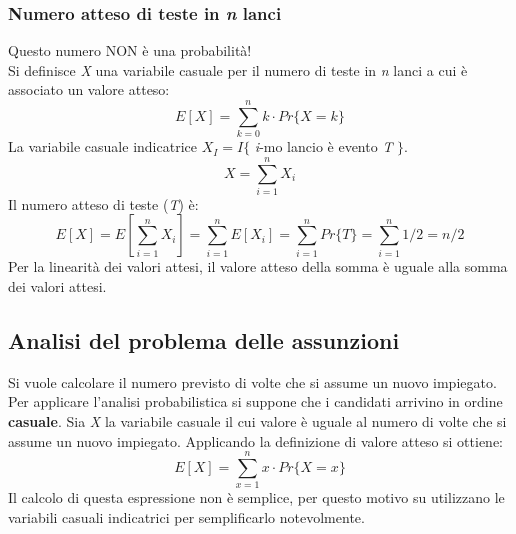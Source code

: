\documentclass[10pt, a4paper]{report}
\begin{document}
\subsubsection{Numero atteso di teste in \textit{n} lanci}
Questo numero NON è una probabilità!\\Si definisce \textit{X} una variabile casuale per il numero di teste in \textit{n} lanci a cui è associato un valore atteso:
\begin{equation*}
E[X] = \sum_{k=0}^{n} k\cdot Pr\{X = k\}
\end{equation*}
La variabile casuale indicatrice $X_I = I\{$ \textit{i}-mo lancio è evento \textit{T} $\}$.
\begin{equation*}
X = \sum_{i=1}^{n}X_i
\end{equation*}
Il numero atteso di teste (\textit{T}) è:
\begin{equation*}
E[X] = E[\sum_{i=1}^{n}X_i] = \sum_{i=1}^{n}E[X_i] = \sum_{i=1}^{n}Pr\{T\} = \sum_{i=1}^{n}1/2 = n/2
\end{equation*}
Per la linearità dei valori attesi, il valore atteso della somma è uguale alla somma dei valori attesi.
\subsection{Analisi del problema delle assunzioni}
Si vuole calcolare il numero previsto di volte che si assume un nuovo impiegato. Per applicare l'analisi probabilistica si suppone che i candidati arrivino in ordine \textbf{casuale}. Sia \textit{X} la variabile casuale il cui valore è uguale al numero di volte che si assume un nuovo impiegato. Applicando la definizione di valore atteso si ottiene:
\begin{equation*}
E[X] = \sum_{x=1}^{n}x\cdot Pr\{X = x\}
\end{equation*}
Il calcolo di questa espressione non è semplice, per questo motivo su utilizzano le variabili casuali indicatrici per semplificarlo notevolmente.
\end{document}
